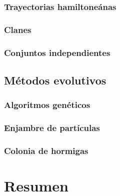 \subsubsection{Trayectorias hamiltoneánas}

\subsubsection{Clanes}

\subsubsection{Conjuntos independientes}

\subsection{Métodos evolutivos}

\subsubsection{Algoritmos genéticos}

\subsubsection{Enjambre de partículas}

\subsubsection{Colonia de hormigas}

\section{Resumen}
